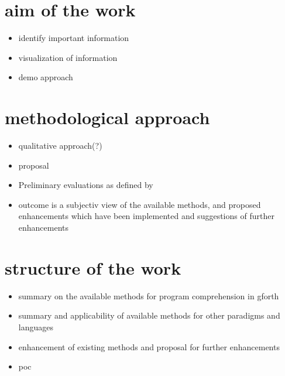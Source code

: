 \section{aim of the work}

\begin{itemize}
\item identify important information
\item visualization of information
\item demo approach
\end{itemize}

\section{methodological approach}

\begin{itemize}
\item qualitative approach(?)
\item proposal
\item Preliminary evaluations as defined by \cite{Cornelissen:2009:SSP:1638616.1639301}
\item outcome is a subjectiv view of the available methods, and proposed enhancements which have been implemented and suggestions of further enhancements
\end{itemize}

\section{structure of the work}

\begin{itemize}
\item summary on the available methods for program comprehension in gforth
\item summary and applicability of available methods for other paradigms and languages
\item enhancement of existing methods and proposal for further enhancements
\item poc
\end{itemize}